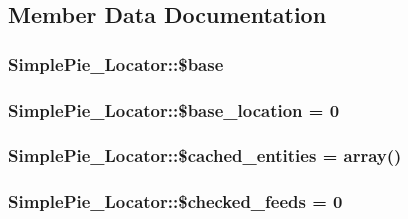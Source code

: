 \subsection{Member Data Documentation}
\hypertarget{class_simple_pie___locator_a2e92a636c168c432ac2243b63909a650}{
\subsubsection[{\$base}]{\setlength{\rightskip}{0pt plus 5cm}Simple\-Pie\-\_\-\-Locator\-::\$base}}\label{class_simple_pie___locator_a2e92a636c168c432ac2243b63909a650}
\hypertarget{class_simple_pie___locator_a44ec5fe2a47ac83820dad5aeec91ae7e}{
\subsubsection[{\$base\-\_\-location}]{\setlength{\rightskip}{0pt plus 5cm}Simple\-Pie\-\_\-\-Locator\-::\$base\-\_\-location = 0}}\label{class_simple_pie___locator_a44ec5fe2a47ac83820dad5aeec91ae7e}
\hypertarget{class_simple_pie___locator_adf8ca5118cd141388bd55d2b5ff59509}{
\subsubsection[{\$cached\-\_\-entities}]{\setlength{\rightskip}{0pt plus 5cm}Simple\-Pie\-\_\-\-Locator\-::\$cached\-\_\-entities = array()}}\label{class_simple_pie___locator_adf8ca5118cd141388bd55d2b5ff59509}
\hypertarget{class_simple_pie___locator_aecf1455c4143100bccc71637e82cbff5}{
\subsubsection[{\$checked\-\_\-feeds}]{\setlength{\rightskip}{0pt plus 5cm}Simple\-Pie\-\_\-\-Locator\-::\$checked\-\_\-feeds = 0}}\label{class_simple_pie___locator_aecf1455c4143100bccc71637e82cbff5}

